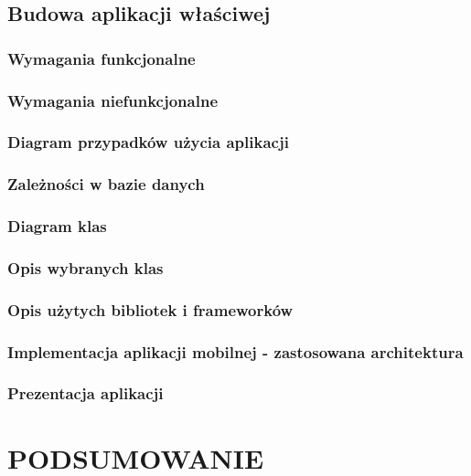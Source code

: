 \documentclass[]{report}
\begin{document}
\section{Budowa aplikacji właściwej}
\subsection{Wymagania funkcjonalne}
\subsection{Wymagania niefunkcjonalne}
\subsection{Diagram przypadków użycia aplikacji}
\subsection{Zależności w bazie danych}
\subsection{Diagram klas}
\subsection{Opis wybranych klas}
\subsection{Opis użytych bibliotek i frameworków}
\subsection{Implementacja aplikacji mobilnej - zastosowana architektura}
\subsection{Prezentacja aplikacji}
\chapter{PODSUMOWANIE}
\end{document}
